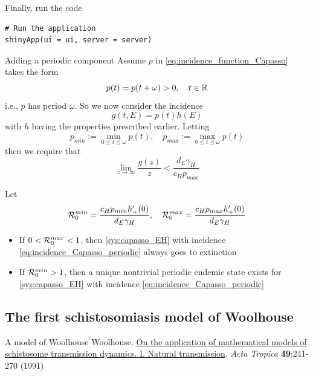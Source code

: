 \documentclass[aspectratio=169]{beamer}
\begin{document}
\begin{frame}[fragile]{Finally, run the code}
\begin{lstlisting}
# Run the application 
shinyApp(ui = ui, server = server)
\end{lstlisting}
\end{frame}
  

\begin{frame}{Adding a periodic component}
  Assume $p$ in \eqref{eq:incidence_function_Capasso} takes the form 
  \begin{equation}
    p(t)=p(t+\omega)>0,\quad t\in\mathbb{R}
  \end{equation}
  i.e., $p$ has period $\omega$. So we now consider the incidence
  \begin{equation}
    \label{eq:incidence_Capasso_periodic}
    g(t,E)=p(t)h(E)
  \end{equation}
  with $h$ having the properties prescribed earlier.
  Letting 
  \begin{equation}
    p_{min} := \min_{0\leq t\leq\omega}p(t),\quad
    p_{max} := \max_{0\leq t\leq\omega}p(t)
  \end{equation}
  then we require that 
  \begin{equation}
    \lim_{z\to\infty}\frac{g(z)}{z}<\frac{d_E\gamma_H}{c_Hp_{max}}
  \end{equation}
\end{frame}


\begin{frame}
  Let
  \begin{equation}
    \label{eq:R0_capasso_periodic}
    \mathcal{R}_0^{min} = \frac{c_Hp_{min}h'_+(0)}{d_E\gamma_H},\quad 
    \mathcal{R}_0^{max} = \frac{c_Hp_{max}h'_+(0)}{d_E\gamma_H}
  \end{equation}
  \begin{theorem}
    \begin{itemize}
      \item If $0<\mathcal{R}_0^{max}<1$, then \eqref{sys:capasso_EH} with incidence \eqref{eq:incidence_Capasso_periodic} always goes to extinction
      \item If $\mathcal{R}_0^{min}>1$, then a unique nontrivial periodic endemic state exists for \eqref{sys:capasso_EH} with incidence \eqref{eq:incidence_Capasso_periodic}
    \end{itemize}
  \end{theorem}
\end{frame}


\subsection{The first schistosomiasis model of Woolhouse}
\begin{frame}{A model of Woolhouse}
  Woolhouse. \href{}{On the application of mathematical models of schistosome transmission dynamics. I. Natural transmission}. \emph{Acta Tropica} \textbf{49}:241-270 (1991)
\end{frame}
\end{document}
